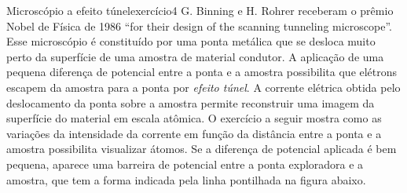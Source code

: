 \begin{exercício}{Microscópio a efeito túnel}{exercício4}
    G. Binning e H. Rohrer receberam o prêmio Nobel de Física de 1986 \enquote{for their design of the scanning tunneling microscope}. Esse microscópio é constituído por uma ponta metálica que se desloca muito perto da superfície de uma amostra de material condutor. A aplicação de uma pequena diferença de potencial entre a ponta e a amostra possibilita que elétrons escapem da amostra para a ponta por \emph{efeito túnel}. A corrente elétrica obtida pelo deslocamento da ponta sobre a amostra permite reconstruir uma imagem da superfície do material em escala atômica. O exercício a seguir mostra como as variações da intensidade da corrente em função da distância entre a ponta e a amostra possibilita visualizar átomos. Se a diferença de potencial aplicada é bem pequena, aparece uma barreira de potencial entre a ponta exploradora e a amostra, que tem a forma indicada pela linha pontilhada na figura abaixo.

    \begin{center}
    \end{center}


\end{exercício}

